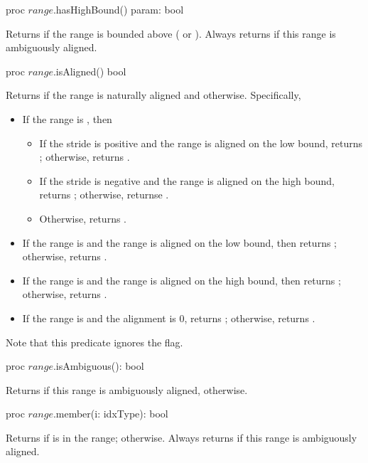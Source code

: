 \begin{protohead}
proc $range$.hasHighBound() param: bool
\end{protohead}
\begin{protobody}
Returns  if the range is bounded above ( or ).
Always returns  if this range is ambiguously aligned.
\end{protobody}

\begin{protohead}
proc $range$.isAligned() bool
\end{protohead}
\begin{protobody}
Returns  if the range is naturally aligned and  otherwise.
Specifically,
\begin{itemize}
\item If the range is , then
\begin{itemize}
\item If the stride is positive and the range is aligned on the low bound,
returns ; otherwise, returns .
\item If the stride is negative and the range is aligned on the high bound,
returns ; otherwise, returnse .
\item Otherwise, returns .
\end{itemize}
\item If the range is  and the range is aligned on the low
bound, then returns ; otherwise, returns .
\item If the range is  and the range is aligned on the high
bound, then returns ; otherwise, returns .
\item If the range is  and the alignment is 0, returns ;
otherwise, returns .
\end{itemize}
Note that this predicate ignores the  flag.
\end{protobody}

\begin{protohead}
proc $range$.isAmbiguous(): bool
\end{protohead}
\begin{protobody}
Returns  if this range is ambiguously aligned,  otherwise.
\end{protobody}

\begin{protohead}
proc $range$.member(i: idxType): bool
\end{protohead}
\begin{protobody}
Returns  if  is in the range;  otherwise.
Always returns  if this range is ambiguously aligned.
\end{protobody}

